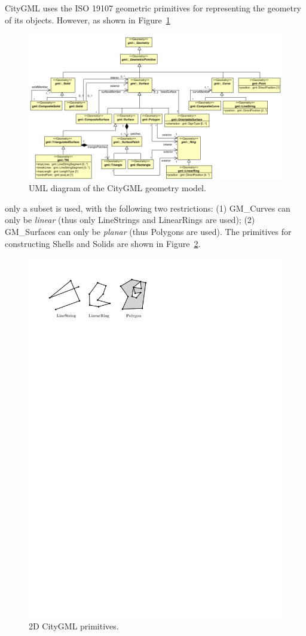 \documentclass[a4paper,parskip=half,11pt]{scrartcl}
\begin{document}
CityGML uses the ISO 19107 geometric primitives for representing the geometry of its objects.
However, as shown in Figure~\ref{fig:citygmlgeom}
\begin{figure}
  \centering
  \includegraphics[width=\linewidth]{figs/citygmlgeom}
  \caption{UML diagram of the CityGML geometry model.}
\label{fig:citygmlgeom}
\end{figure}
only a subset is used, with the following two restrictions: (1) GM\_Curves can only be \emph{linear} (thus only LineStrings and LinearRings are used); (2) GM\_Surfaces can only be \emph{planar} (thus Polygons are used).
The primitives for constructing Shells and Solids are shown in Figure~\ref{fig:citygmlprimitives}.
\begin{figure}
  \centering
  \includegraphics[width=0.6\linewidth]{figs/citygmlprimitives}
  \caption{2D CityGML primitives.}
\label{fig:citygmlprimitives}
\end{figure}
\end{document}
